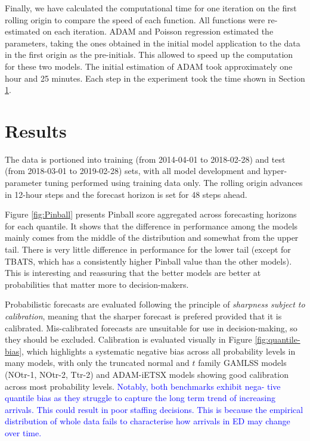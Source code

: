\documentclass[]{elsarticle} %
\begin{document}
Finally, we have calculated the computational time for one iteration on
the first rolling origin to compare the speed of each function. All
functions were re-estimated on each iteration. ADAM and Poisson
regression estimated the parameters, taking the ones obtained in the
initial model application to the data in the first origin as the
pre-initials. This allowed to speed up the computation for these two
models. The initial estimation of ADAM took approximately one hour and
25 minutes. Each step in the experiment took the time shown in Section
\ref{result}.

\hypertarget{result}{%
\section{Results}\label{result}}

The data is portioned into training (from 2014-04-01 to 2018-02-28) and
test (from 2018-03-01 to 2019-02-28) sets, with all model development
and hyper-parameter tuning performed using training data only. The
rolling origin advances in 12-hour steps and the forecast horizon is set
for 48 steps ahead.

Figure \ref{fig:Pinball} presents Pinball score aggregated across
forecasting horizons for each quantile. It shows that the difference in
performance among the models mainly comes from the middle of the
distribution and somewhat from the upper tail. There is very little
difference in performance for the lower tail (except for TBATS, which
has a consistently higher Pinball value than the other models). This is
interesting and reassuring that the better models are better at
probabilities that matter more to decision-makers.

Probabilistic forecasts are evaluated following the principle of
\emph{sharpness subject to calibration}, meaning that the sharper forecast is
prefered provided that it is calibrated. Mis-calibrated forecasts are
unsuitable for use in decision-making, so they should be excluded.
Calibration is evaluated visually in Figure \ref{fig:quantile-bias},
which highlights a systematic negative bias across all probability
levels in many models, with only the truncated normal and \(t\) family
GAMLSS models (NOtr-1, NOtr-2, Ttr-2) and ADAM-iETSX models showing good
calibration across most probability levels. \textcolor{blue}{ Notably, both benchmarks exhibit nega-
tive quantile bias as they struggle to capture the long term trend of increasing arrivals.
This could result in poor staffing decisions. This is because the empirical distribution of
whole data fails to characterise how arrivals in ED may change over time.}
\end{document}
